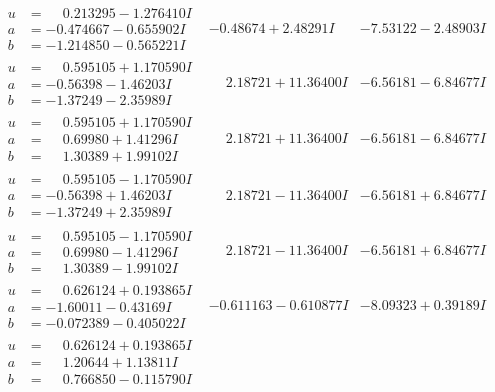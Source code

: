 \documentclass[1p]{elsarticle_modified}
\theoremstyle{definition}
\begin{document}
$$\begin{array}{c|c|c}
\begin{aligned}
u &= \phantom{-}0.213295 - 1.276410 I \\
a &= -0.474667 - 0.655902 I \\
b &= -1.214850 - 0.565221 I\end{aligned}
 & -0.48674 + 2.48291 I & -7.53122 - 2.48903 I \\ \hline\begin{aligned}
u &= \phantom{-}0.595105 + 1.170590 I \\
a &= -0.56398 - 1.46203 I \\
b &= -1.37249 - 2.35989 I\end{aligned}
 & \phantom{-}2.18721 + 11.36400 I & -6.56181 - 6.84677 I \\ \hline\begin{aligned}
u &= \phantom{-}0.595105 + 1.170590 I \\
a &= \phantom{-}0.69980 + 1.41296 I \\
b &= \phantom{-}1.30389 + 1.99102 I\end{aligned}
 & \phantom{-}2.18721 + 11.36400 I & -6.56181 - 6.84677 I \\ \hline\begin{aligned}
u &= \phantom{-}0.595105 - 1.170590 I \\
a &= -0.56398 + 1.46203 I \\
b &= -1.37249 + 2.35989 I\end{aligned}
 & \phantom{-}2.18721 - 11.36400 I & -6.56181 + 6.84677 I \\ \hline\begin{aligned}
u &= \phantom{-}0.595105 - 1.170590 I \\
a &= \phantom{-}0.69980 - 1.41296 I \\
b &= \phantom{-}1.30389 - 1.99102 I\end{aligned}
 & \phantom{-}2.18721 - 11.36400 I & -6.56181 + 6.84677 I \\ \hline\begin{aligned}
u &= \phantom{-}0.626124 + 0.193865 I \\
a &= -1.60011 - 0.43169 I \\
b &= -0.072389 - 0.405022 I\end{aligned}
 & -0.611163 - 0.610877 I & -8.09323 + 0.39189 I \\ \hline\begin{aligned}
u &= \phantom{-}0.626124 + 0.193865 I \\
a &= \phantom{-}1.20644 + 1.13811 I \\
b &= \phantom{-}0.766850 - 0.115790 I\end{aligned}

\end{array}$$
\end{document}
